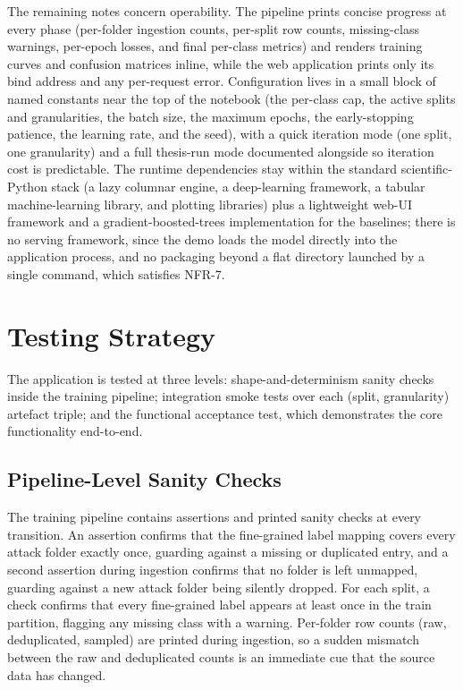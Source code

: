 \par The remaining notes concern operability. The pipeline prints concise progress at every phase (per-folder ingestion counts, per-split row counts, missing-class warnings, per-epoch losses, and final per-class metrics) and renders training curves and confusion matrices inline, while the web application prints only its bind address and any per-request error. Configuration lives in a small block of named constants near the top of the notebook (the per-class cap, the active splits and granularities, the batch size, the maximum epochs, the early-stopping patience, the learning rate, and the seed), with a quick iteration mode (one split, one granularity) and a full thesis-run mode documented alongside so iteration cost is predictable. The runtime dependencies stay within the standard scientific-Python stack (a lazy columnar engine, a deep-learning framework, a tabular machine-learning library, and plotting libraries) plus a lightweight web-UI framework and a gradient-boosted-trees implementation for the baselines; there is no serving framework, since the demo loads the model directly into the application process, and no packaging beyond a flat directory launched by a single command, which satisfies NFR-7.

\section{Testing Strategy}
\label{sec:testing_strategy}

\par The application is tested at three levels: shape-and-determinism sanity checks inside the training pipeline; integration smoke tests over each (split, granularity) artefact triple; and the functional acceptance test, which demonstrates the core functionality end-to-end.

\subsection{Pipeline-Level Sanity Checks}
\label{subsec:notebook_sanity}

\par The training pipeline contains assertions and printed sanity checks at every transition. An assertion confirms that the fine-grained label mapping covers every attack folder exactly once, guarding against a missing or duplicated entry, and a second assertion during ingestion confirms that no folder is left unmapped, guarding against a new attack folder being silently dropped. For each split, a check confirms that every fine-grained label appears at least once in the train partition, flagging any missing class with a warning. Per-folder row counts (raw, deduplicated, sampled) are printed during ingestion, so a sudden mismatch between the raw and deduplicated counts is an immediate cue that the source data has changed.

